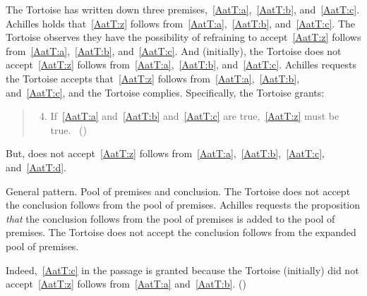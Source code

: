 \begin{note}
  The Tortoise has written down three premises,~\ref{AatT:a},~\ref{AatT:b}, and~\ref{AatT:c}.
  Achilles holds that~\ref{AatT:z} follows from~\ref{AatT:a},~\ref{AatT:b}, and~\ref{AatT:c}.
  The Tortoise observes they have the possibility of refraining to accept~\ref{AatT:z} follows from~\ref{AatT:a},~\ref{AatT:b}, and~\ref{AatT:c}.
  And (initially), the Tortoise does not accept~\ref{AatT:z} follows from~\ref{AatT:a},~\ref{AatT:b}, and~\ref{AatT:c}.
  Achilles requests the Tortoise accepts that~\ref{AatT:z} follows from~\ref{AatT:a},~\ref{AatT:b}, and~\ref{AatT:c}, and the Tortoise complies.
  Specifically, the Tortoise grants:

  \begin{quote}
    \begin{enumerate}[label=(\emph{\Alph*}), ref=\emph{\Alph*}]
      \setcounter{enumi}{3}
    \item
      \label{AatT:d}
      If~\ref{AatT:a} and~\ref{AatT:b} and~\ref{AatT:c} are true,~\ref{AatT:z} must be true.%
      \mbox{ }\hfill\mbox{(\citeyear[279]{Carroll:1895uj})}
    \end{enumerate}
  \end{quote}

  But, does not accept~\ref{AatT:z} follows from~\ref{AatT:a},~\ref{AatT:b},~\ref{AatT:c}, and~\ref{AatT:d}.

  General pattern.
  Pool of premises and conclusion.
  The Tortoise does not accept the conclusion follows from the pool of premises.
  Achilles requests the proposition \emph{that} the conclusion follows from the pool of premises is added to the pool of premises.
  The Tortoise does not accept the conclusion follows from the expanded pool of premises.

  Indeed,~\ref{AatT:c} in the passage is granted because the Tortoise (initially) did not accept~\ref{AatT:z} follows from~\ref{AatT:a} and~\ref{AatT:b}.
  (\citeyear[279]{Carroll:1895uj})
\end{note}


